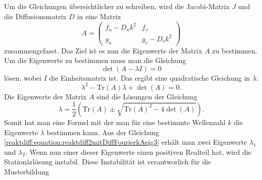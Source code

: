 Um die Gleichungen übersichtlicher zu schreiben, wird die Jacobi-Matrix \(J\) und die Diffusionsmatrix \(D\) in eine Matrix
\begin{equation}
    \label{reaktdiff:equation:reaktdiff2mitDiffFourierkA}
    A =
    \begin{pmatrix}
        f_u - D_u k^2 & f_v\\
        g_u & g_v - D_v k^2
    \end{pmatrix}
\end{equation}
zusammengefasst.
Das Ziel ist es nun die Eigenwerte der Matrix \(A\) zu bestimmen.
Um die Eigenwerte zu bestimmen muss man die Gleichung
\begin{equation}
    \det(A - \lambda I) = 0
\label{reaktdiff:equation:reaktdiff2mitDiffFourierkAeig}
\end{equation}
lösen, wobei \(I\) die Einheitsmatrix ist.
Das ergibt eine quadratische Gleichung in \(\lambda\):
\begin{equation}
    \lambda^2 - \text{Tr}(A) \lambda + \det(A) = 0.
\label{reaktdiff:equation:reaktdiff2mitDiffFourierkAeig2}
\end{equation}
Die Eigenwerte der Matrix \(A\) sind die Lösungen der Gleichung
\begin{equation}
    \lambda = \frac{1}{2} \left( \text{Tr}(A) \pm 
    \sqrt{\text{Tr}(A)^2 - 4 \det(A)} \right).
\label{reaktdiff:equation:reaktdiff2mitDiffFourierkAeig3}
\end{equation}
Somit hat man eine Formel mit der man für eine bestimmte Wellenzahl \(k\) die Eigenwerte \(\lambda\) bestimmen kann.
Aus der Gleichung \ref{reaktdiff:equation:reaktdiff2mitDiffFourierkAeig3} erhält man zwei Eigenwerte \(\lambda_1\) und \(\lambda_2\).
Wenn nun einer dieser Eigenwerte einen positiven Realteil hat, wird die Stationärlösung instabil.
Diese Instabilität ist verantworlich für die Musterbildung


